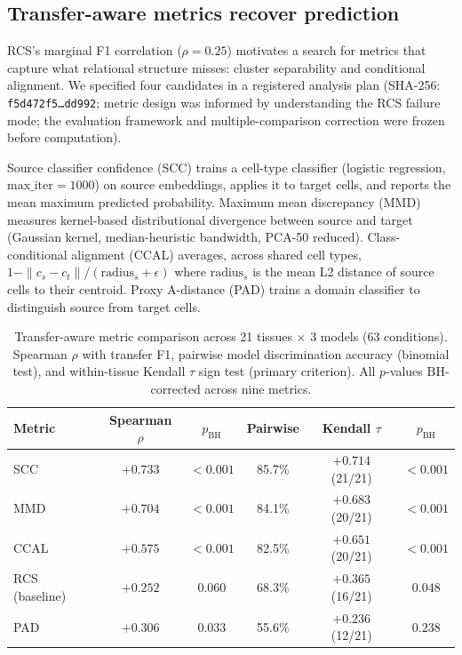 \documentclass[11pt]{article}
\begin{document}
\subsection{Transfer-aware metrics recover prediction}
\label{sec:scc}

RCS's marginal F1 correlation ($\rho = 0.25$) motivates a search for
metrics that capture what relational structure misses: cluster
separability and conditional alignment. We specified four candidates in
a registered analysis plan (SHA-256:
\texttt{f5d472f5\ldots dd992}; metric design was informed by
understanding the RCS failure mode; the evaluation framework and
multiple-comparison correction were frozen before computation).

Source classifier confidence (SCC) trains a cell-type classifier
(logistic regression, $\text{max\_iter} = 1000$) on source embeddings,
applies it to target cells, and reports the mean maximum predicted
probability. Maximum mean discrepancy (MMD) measures kernel-based
distributional divergence between source and target (Gaussian kernel,
median-heuristic bandwidth, PCA-50 reduced). Class-conditional alignment
(CCAL) averages, across shared cell types, $1 - \|c_s - c_t\| /
(\text{radius}_s + \epsilon)$ where $\text{radius}_s$ is the mean L2
distance of source cells to their centroid. Proxy A-distance (PAD)
trains a domain classifier to distinguish source from target cells.

\begin{table}[t]
\centering
\caption{Transfer-aware metric comparison across 21 tissues
$\times$ 3 models (63 conditions). Spearman $\rho$ with transfer F1,
pairwise model discrimination accuracy (binomial test), and
within-tissue Kendall $\tau$ sign test (primary criterion). All
$p$-values BH-corrected across nine metrics.}
\label{tab:scc}
\small
\begin{tabular}{@{}lccccc@{}}
\toprule
Metric & Spearman $\rho$ & $p_{\text{BH}}$ & Pairwise & Kendall $\tau$ & $p_{\text{BH}}$ \\
\midrule
SCC              & $+0.733$ & $<0.001$ & 85.7\% & $+0.714$ (21/21) & $<0.001$ \\
MMD              & $+0.704$ & $<0.001$ & 84.1\% & $+0.683$ (20/21) & $<0.001$ \\
CCAL             & $+0.575$ & $<0.001$ & 82.5\% & $+0.651$ (20/21) & $<0.001$ \\
RCS (baseline)   & $+0.252$ & $0.060$  & 68.3\% & $+0.365$ (16/21) & $0.048$  \\
PAD              & $+0.306$ & $0.033$  & 55.6\% & $+0.236$ (12/21) & $0.238$  \\
\bottomrule
\end{tabular}
\end{table}
\end{document}
